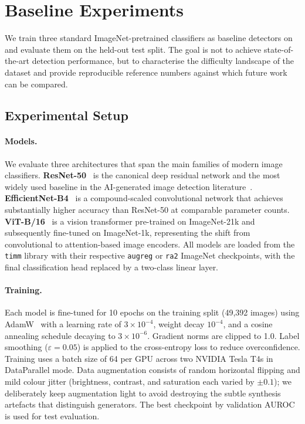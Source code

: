 \section{Baseline Experiments}
\label{sec:experiments}

We train three standard ImageNet-pretrained classifiers as baseline
detectors on \textbf{\datasetname} and evaluate them on the held-out
test split.
The goal is not to achieve state-of-the-art detection performance,
but to characterise the difficulty landscape of the dataset and
provide reproducible reference numbers against which future work can
be compared.

\subsection{Experimental Setup}
\label{ssec:exp_setup}

\paragraph{Models.}
We evaluate three architectures that span the main families of
modern image classifiers.
\textbf{ResNet-50}~\cite{he2016resnet} is the canonical deep residual
network and the most widely used baseline in the AI-generated image
detection literature~\cite{wang2020cnn,zhu2023genimage}.
\textbf{EfficientNet-B4}~\cite{tan2019efficientnet} is a
compound-scaled convolutional network that achieves substantially
higher accuracy than ResNet-50 at comparable parameter counts.
\textbf{ViT-B/16}~\cite{dosovitskiy2021vit} is a vision transformer
pre-trained on ImageNet-21k and subsequently fine-tuned on ImageNet-1k,
representing the shift from convolutional to attention-based image
encoders.
All models are loaded from the \texttt{timm} library with their
respective \texttt{augreg} or \texttt{ra2} ImageNet checkpoints,
with the final classification head replaced by a two-class linear
layer.

\paragraph{Training.}
Each model is fine-tuned for 10 epochs on the training split
(49,392 images) using AdamW~\cite{loshchilov2019adamw} with a
learning rate of $3 \times 10^{-4}$, weight decay $10^{-4}$, and a
cosine annealing schedule decaying to $3 \times 10^{-6}$.
Gradient norms are clipped to 1.0.
Label smoothing ($\varepsilon = 0.05$) is applied to the
cross-entropy loss to reduce overconfidence.
Training uses a batch size of 64 per GPU across two NVIDIA Tesla T4s
in DataParallel mode.
Data augmentation consists of random horizontal flipping and mild
colour jitter (brightness, contrast, and saturation each varied by
$\pm 0.1$); we deliberately keep augmentation light to avoid
destroying the subtle synthesis artefacts that distinguish generators.
The best checkpoint by validation AUROC is used for test evaluation.


